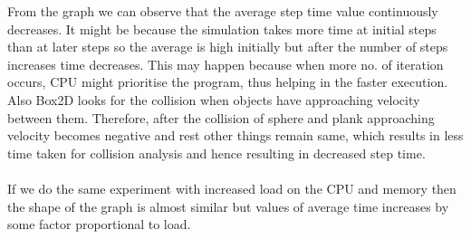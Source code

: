 \documentclass[11pt]{article}
\begin{document}
\begin{subsection}
From the graph we can observe that the average step time value continuously decreases. It might be because the simulation takes more time at initial steps than at later steps so the average is high initially but after the number of steps increases time decreases. This may happen because when more no. of iteration occurs, CPU might prioritise the program, thus helping in the faster execution. Also Box2D looks for the collision when objects have approaching velocity between them. Therefore, after the collision of sphere and plank approaching velocity becomes negative and rest other things remain same, which results in less time taken for collision analysis and hence resulting in decreased step time.
\\\\
If we do the same experiment with increased load on the CPU and memory then the shape of the graph is almost similar but values of average time increases by some factor proportional to load.
\end{subsection}
\end{document}

